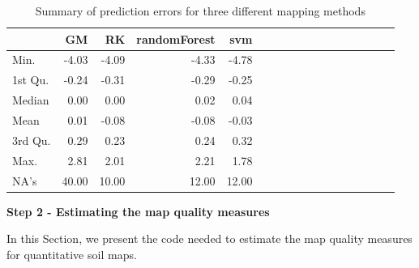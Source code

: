 \documentclass[10pt,b5paper,]{book}
\theoremstyle{definition}
\theoremstyle{definition}
\theoremstyle{definition}
\theoremstyle{remark}
\begin{document}
\begin{table}

\caption{\label{tab:prederrors}Summary of prediction errors for three different mapping methods}
\centering
\begin{tabular}[t]{lrrrrrrrrrrrrrrrr}
\toprule
  & GM & RK & randomForest & svm\\
\midrule
Min. & -4.03 & -4.09 & -4.33 & -4.78\\
1st Qu. & -0.24 & -0.31 & -0.29 & -0.25\\
Median & 0.00 & 0.00 & 0.02 & 0.04\\
Mean & 0.01 & -0.08 & -0.08 & -0.03\\
3rd Qu. & 0.29 & 0.23 & 0.24 & 0.32\\
\addlinespace
Max. & 2.81 & 2.01 & 2.21 & 1.78\\
NA's & 40.00 & 10.00 & 12.00 & 12.00\\
\bottomrule
\end{tabular}
\end{table}

\textbf{Step 2 - Estimating the map quality measures}

In this Section, we present the code needed to estimate the map quality
measures for quantitative soil maps.
\end{document}
